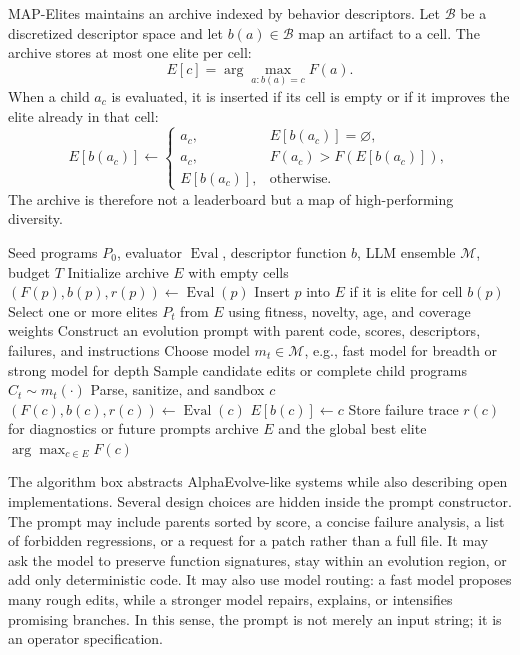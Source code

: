 MAP-Elites maintains an archive indexed by behavior descriptors.  Let $\mathcal{B}$ be a discretized descriptor space and let $b(a)\in\mathcal{B}$ map an artifact to a cell.  The archive stores at most one elite per cell:
\begin{equation}
  E[c] = \arg\max_{a: b(a)=c} F(a).
\end{equation}
When a child $a_c$ is evaluated, it is inserted if its cell is empty or if it improves the elite already in that cell:
\begin{equation}
  E[b(a_c)] \leftarrow
  \begin{cases}
    a_c, & E[b(a_c)] = \varnothing,\\
    a_c, & F(a_c) > F(E[b(a_c)]),\\
    E[b(a_c)], & \text{otherwise.}
  \end{cases}
\end{equation}
The archive is therefore not a leaderboard but a map of high-performing diversity.

\begin{algorithm}[t]
\caption{LLM-guided MAP-Elites for evolutionary code discovery}
\label{alg:llm-map-elites}
\begin{algorithmic}[1]
\REQUIRE Seed programs $P_0$, evaluator $\operatorname{Eval}$, descriptor function $b$, LLM ensemble $\mathcal{M}$, budget $T$
\STATE Initialize archive $E$ with empty cells
  \STATE $(F(p), b(p), r(p)) \leftarrow \operatorname{Eval}(p)$
  \STATE Insert $p$ into $E$ if it is elite for cell $b(p)$
\ENDFOR
{}
  \STATE Select one or more elites $P_t$ from $E$ using fitness, novelty, age, and coverage weights
  \STATE Construct an evolution prompt with parent code, scores, descriptors, failures, and instructions
  \STATE Choose model $m_t\in\mathcal{M}$, e.g., fast model for breadth or strong model for depth
  \STATE Sample candidate edits or complete child programs $C_t\sim m_t(\cdot)$
    \STATE Parse, sanitize, and sandbox $c$
    \STATE $(F(c), b(c), r(c))\leftarrow \operatorname{Eval}(c)$
      \STATE $E[b(c)]\leftarrow c$
    \ELSE
      \STATE Store failure trace $r(c)$ for diagnostics or future prompts
    \ENDIF
  \ENDFOR
\ENDFOR
\RETURN archive $E$ and the global best elite $\arg\max_{c\in E}F(c)$
\end{algorithmic}
\end{algorithm}

The algorithm box abstracts AlphaEvolve-like systems while also describing open implementations.  Several design choices are hidden inside the prompt constructor.  The prompt may include parents sorted by score, a concise failure analysis, a list of forbidden regressions, or a request for a patch rather than a full file.  It may ask the model to preserve function signatures, stay within an evolution region, or add only deterministic code.  It may also use model routing: a fast model proposes many rough edits, while a stronger model repairs, explains, or intensifies promising branches.  In this sense, the prompt is not merely an input string; it is an operator specification.

